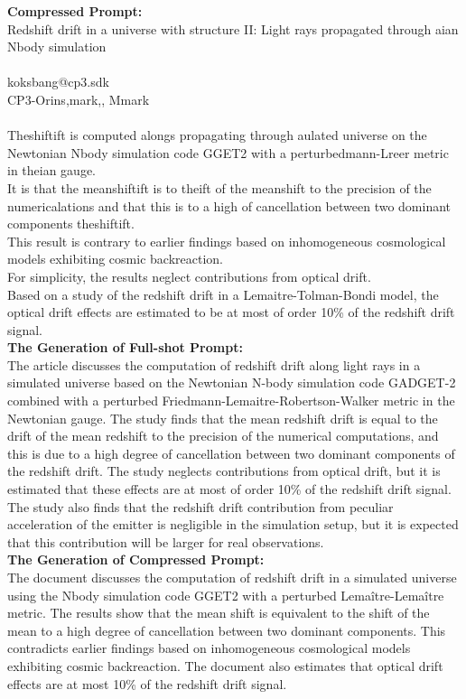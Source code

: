 \begin{figure*}[htb]
    \begin{tcolorbox}
    \textbf{Compressed Prompt:}\\
    Redshift drift in a universe with structure II: Light rays propagated through aian Nbody simulation\\\\koksbang@cp3.sdk\\	CP3-Orins,mark,, Mmark\\\\Theshiftift is computed alongs propagating through aulated universe on the Newtonian Nbody simulation code GGET2 with a perturbedmann-Lreer metric in theian gauge.\\It is that the meanshiftift is to theift of the meanshift to the precision of the numericalations and that this is to a high of cancellation between two dominant components theshiftift.\\This result is contrary to earlier findings based on inhomogeneous cosmological models exhibiting cosmic backreaction.\\For simplicity, the results neglect contributions from optical drift.\\Based on a study of the redshift drift in a Lemaitre-Tolman-Bondi model, the optical drift effects are estimated to be at most of order 10\% of the redshift drift signal.\\
    \textbf{The Generation of Full-shot Prompt:}\\
    The article discusses the computation of redshift drift along light rays in a simulated universe based on the Newtonian N-body simulation code GADGET-2 combined with a perturbed Friedmann-Lemaitre-Robertson-Walker metric in the Newtonian gauge. The study finds that the mean redshift drift is equal to the drift of the mean redshift to the precision of the numerical computations, and this is due to a high degree of cancellation between two dominant components of the redshift drift. The study neglects contributions from optical drift, but it is estimated that these effects are at most of order 10\% of the redshift drift signal. The study also finds that the redshift drift contribution from peculiar acceleration of the emitter is negligible in the simulation setup, but it is expected that this contribution will be larger for real observations.\\
    \textbf{The Generation of Compressed Prompt:}\\
    The document discusses the computation of redshift drift in a simulated universe using the Nbody simulation code GGET2 with a perturbed Lemaître-Lemaître metric. The results show that the mean shift is equivalent to the shift of the mean to a high degree of cancellation between two dominant components. This contradicts earlier findings based on inhomogeneous cosmological models exhibiting cosmic backreaction. The document also estimates that optical drift effects are at most 10\% of the redshift drift signal.\\

\end{tcolorbox}
\end{figure*}
